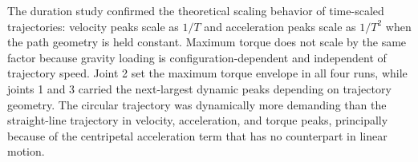 \documentclass[12pt,a4paper]{article}
\begin{document}
The duration study confirmed the theoretical scaling behavior of time-scaled trajectories:
velocity peaks scale as $1/T$ and acceleration peaks scale as $1/T^2$ when the path geometry
is held constant. Maximum torque does not scale by the same factor because gravity loading
is configuration-dependent and independent of trajectory speed. Joint 2 set the maximum torque
envelope in all four runs, while joints 1 and 3 carried the next-largest dynamic peaks
depending on trajectory geometry. The circular trajectory was dynamically more demanding than
the straight-line
trajectory in velocity, acceleration, and torque peaks, principally because of the centripetal
acceleration term that has no counterpart in linear motion.
\end{document}
